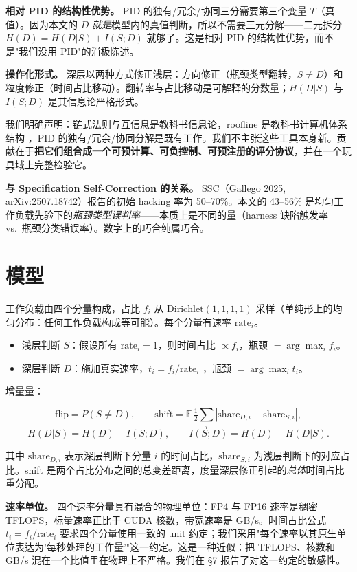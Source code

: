 \documentclass[10pt]{article}
\providecommand{\tightlist}{\relax}
\begin{document}
\textbf{相对 PID 的结构性优势。} PID 的独有/冗余/协同三分需要第三个变量 $T$（真值）。因为本文的 $D$ \emph{就是}模型内的真值判断，所以不需要三元分解——二元拆分 $H(D)=H(D|S)+I(S;D)$ 就够了。这是相对 PID 的结构性优势，而不是"我们没用 PID"的消极陈述。

\textbf{操作化形式。} 深层以两种方式修正浅层：方向修正（瓶颈类型翻转，$S\neq D$）和粒度修正（时间占比移动）。翻转率与占比移动是可解释的分数量；$H(D|S)$ 与 $I(S;D)$ 是其信息论严格形式。

我们明确声明：链式法则与互信息是教科书信息论，roofline 是教科书计算机体系结构 \citep{roofline2009}，PID 的独有/冗余/协同分解是既有工作。我们不主张这些工具本身新。贡献在于\textbf{把它们组合成一个可预计算、可负控制、可预注册的评分协议}，并在一个玩具域上完整检验它。

\textbf{与 Specification Self-Correction 的关系。} SSC（Gallego 2025, arXiv:2507.18742）报告的初始 hacking 率为 50--70\%。本文的 43--56\% 是均匀工作负载先验下的\emph{瓶颈类型误判率}——本质上是不同的量（harness 缺陷触发率 vs.\ 瓶颈分类错误率）。数字上的巧合纯属巧合。



\section{模型}\label{model}

工作负载由四个分量构成，占比 $f_i$ 从 $\mathrm{Dirichlet}(1,1,1,1)$ 采样（单纯形上的均匀分布：任何工作负载构成等可能）。每个分量有速率 $\mathrm{rate}_i$。

\begin{itemize}
\tightlist
\item
  浅层判断 $S$：假设所有 $\mathrm{rate}_i=1$，则时间占比 $\propto f_i$，瓶颈 $=\arg\max_i f_i$。
\item
  深层判断 $D$：施加真实速率，$t_i=f_i/\mathrm{rate}_i$ \citep{rooflineTime2020}，瓶颈 $=\arg\max_i t_i$。
\end{itemize}

增量量：

\[
\text{flip}=P(S\neq D),\qquad \text{shift}=\mathbb{E}\,\tfrac{1}{2}\!\sum_i|\mathrm{share}_{D,i}-\mathrm{share}_{S,i}|,
\] \[
H(D|S)=H(D)-I(S;D),\qquad I(S;D)=H(D)-H(D|S).
\]

其中 $\mathrm{share}_{D,i}$ 表示深层判断下分量 $i$ 的时间占比，$\mathrm{share}_{S,i}$ 为浅层判断下的对应占比。shift 是两个占比分布之间的总变差距离，度量深层修正引起的\emph{总体}时间占比重分配。

\textbf{速率单位。} 四个速率分量具有混合的物理单位：FP4 与 FP16 速率是稠密 TFLOPS，标量速率正比于 CUDA 核数，带宽速率是 GB/s。时间占比公式 $t_i=f_i/\mathrm{rate}_i$ 要求四个分量使用一致的 unit 约定；我们采用"每个速率以其原生单位表达为'每秒处理的工作量'"这一约定。这是一种近似：把 TFLOPS、核数和 GB/s 混在一个比值里在物理上不严格。我们在 §7 报告了对这一约定的敏感性。
\end{document}
